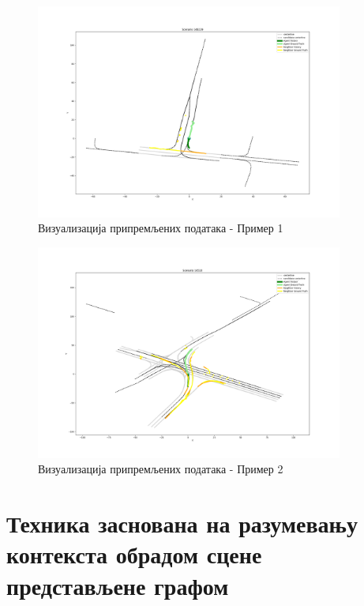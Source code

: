 \documentclass[11pt,oneside]{memoir}
\begin{document}
\begin{figure}[H]
  \includegraphics[width=0.9\textwidth]{images/scenario_148229.png}
  \caption{Визуализација припремљених података - Пример 1}
  \label{scenario-example-148229}
\end{figure}

\begin{figure}[H]
  \includegraphics[width=0.9\textwidth]{images/scenario_16518.png}
  \caption{Визуализација припремљених података - Пример 2}
  \label{scenario-example-16518}
\end{figure}

\chapter{Техника заснована на разумевању контекста обрадом сцене представљене графом}
\label{chp:razrada}
\end{document}
